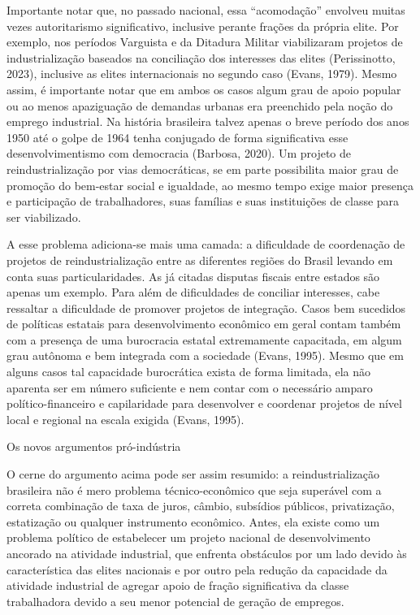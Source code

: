 Importante notar que, no passado nacional, essa ``acomodação'' envolveu
muitas vezes autoritarismo significativo, inclusive perante frações da
própria elite. Por exemplo, nos períodos Varguista e da Ditadura Militar
viabilizaram projetos de industrialização baseados na conciliação dos
interesses das elites (Perissinotto, 2023), inclusive as elites
internacionais no segundo caso (Evans, 1979). Mesmo assim, é importante
notar que em ambos os casos algum grau de apoio popular ou ao menos
apaziguação de demandas urbanas era preenchido pela noção do emprego
industrial. Na história brasileira talvez apenas o breve período dos
anos 1950 até o golpe de 1964 tenha conjugado de forma significativa
esse desenvolvimentismo com democracia (Barbosa, 2020). Um projeto de
reindustrialização por vias democráticas, se em parte possibilita maior
grau de promoção do bem-estar social e igualdade, ao mesmo tempo exige
maior presença e participação de trabalhadores, suas famílias e suas
instituições de classe para ser viabilizado.

A esse problema adiciona-se mais uma camada: a dificuldade de
coordenação de projetos de reindustrialização entre as diferentes
regiões do Brasil levando em conta suas particularidades. As já citadas
disputas fiscais entre estados são apenas um exemplo. Para além de
dificuldades de conciliar interesses, cabe ressaltar a dificuldade de
promover projetos de integração. Casos bem sucedidos de políticas
estatais para desenvolvimento econômico em geral contam também com a
presença de uma burocracia estatal extremamente capacitada, em algum
grau autônoma e bem integrada com a sociedade (Evans, 1995). Mesmo que
em alguns casos tal capacidade burocrática exista de forma limitada, ela
não aparenta ser em número suficiente e nem contar com o necessário
amparo político-financeiro e capilaridade para desenvolver e coordenar
projetos de nível local e regional na escala exigida (Evans, 1995).

Os novos argumentos pró-indústria

O cerne do argumento acima pode ser assim resumido: a reindustrialização
brasileira não é mero problema técnico-econômico que seja superável com
a correta combinação de taxa de juros, câmbio, subsídios públicos,
privatização, estatização ou qualquer instrumento econômico. Antes, ela
existe como um problema político de estabelecer um projeto nacional de
desenvolvimento ancorado na atividade industrial, que enfrenta
obstáculos por um lado devido às característica das elites nacionais e
por outro pela redução da capacidade da atividade industrial de agregar
apoio de fração significativa da classe trabalhadora devido a seu menor
potencial de geração de empregos.


